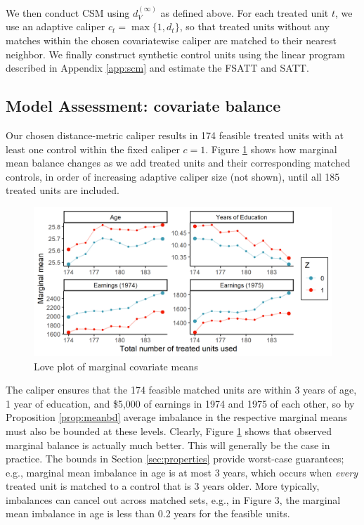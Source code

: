 \documentclass{article}
\begin{document}
We then conduct CSM using $d_V^{(\infty)}$ as defined above.
For each treated unit $t$, we use an adaptive caliper $c_t = \max \{1, d_t\}$, so that treated units without any matches within the chosen covariatewise caliper are matched to their nearest neighbor.
We finally construct synthetic control units using the linear program described in Appendix \ref{app:scm} and estimate the FSATT and SATT.

\subsection{Model Assessment: covariate balance}


Our chosen distance-metric caliper results in 174 feasible treated units with at least one control within the fixed caliper $c=1$.
Figure \ref{fig:lalonde_love} shows how marginal mean balance changes as we add treated units and their corresponding matched controls, in order of increasing adaptive caliper size (not shown), until all 185 treated units are included.
\begin{figure}
    \centering
    \includegraphics[width=\textwidth]{writeup/figures/lalonde_love2.png}
    \caption{Love plot of marginal covariate means}
    \label{fig:lalonde_love}
\end{figure}

The caliper ensures that the 174 feasible matched units are within 3 years of age, 1 year of education, and \$5,000 of earnings in 1974 and 1975 of each other, so by Proposition \ref{prop:meanbd} average imbalance in the respective marginal means must also be bounded at these levels.
Clearly, Figure \ref{fig:lalonde_love} shows that observed marginal balance is actually much better.
This will generally be the case in practice.
The bounds in Section \ref{sec:properties} provide worst-case guarantees; 
e.g., marginal mean imbalance in age is at most 3 years, which occurs when \textit{every} treated unit is matched to a control that is 3 years older.
More typically, imbalances can cancel out across matched sets, e.g., in Figure 3, the marginal mean imbalance in age is less than 0.2 years for the feasible units.
\end{document}
